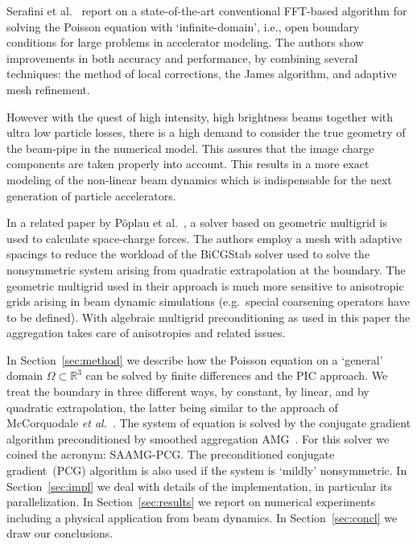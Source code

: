 \documentclass[a4paper,10pt,3p,preprint,pdftex]{elsarticle}
\renewcommand{\Re}{\mathbb{R}}
\newcommand{\oursolver}{\textsc{SAAMG-PCG}}
\begin{document}
Serafini et al.~\cite{serafini_2005} report on a state-of-the-art
conventional FFT-based algorithm for solving the Poisson equation with
`infinite-domain', i.e., open boundary conditions for large problems in
accelerator modeling.  The authors show improvements in both accuracy
and performance, by combining several techniques: the method of local
corrections, the James algorithm, and adaptive mesh refinement.

However with the quest of high intensity, high brightness beams together
with ultra low particle losses, there is a high demand to consider the
true geometry of the beam-pipe in the numerical model. This assures that
the image charge components are taken properly into account. This
results in a more exact modeling of the non-linear beam dynamics which
is indispensable for the next generation of particle accelerators.

In a related paper by P{\"o}plau et
al.~\cite{poplau_self-adaptive_2008}, a solver based on geometric
multigrid is used to calculate space-charge forces.  The authors employ
a mesh with adaptive spacings to reduce the workload of the BiCGStab
solver used to solve the nonsymmetric system arising from quadratic
extrapolation at the boundary.  The geometric multigrid used in their
approach is much more sensitive to anisotropic grids arising in beam
dynamic simulations (e.g.\ special coarsening operators have to be
defined).  With algebraic multigrid preconditioning as used in this
paper the aggregation takes care of anisotropies and related issues.

In Section~\ref{sec:method} we describe how the Poisson equation on a
`general' domain $\Omega \subset \Re^3$ can be solved by finite
differences and the PIC approach.  We treat the boundary in three
different ways, by constant, by linear, and by quadratic extrapolation,
the latter being similar to the approach of McCorquodale \textit{et
  al.}~\cite{mcgv:04}.  The system of equation is solved by the
conjugate gradient algorithm preconditioned by smoothed aggregation
AMG~\cite{vamb:96a, tuto:00}. For this solver we coined the acronym: \oursolver.  The preconditioned conjugate
gradient~(PCG) algorithm is also used if the system is `mildly'
nonsymmetric.  In Section~\ref{sec:impl} we deal with details of the
implementation, in particular its parallelization.  In
Section~\ref{sec:results} we report on numerical experiments including a
physical application from beam dynamics.  In Section~\ref{sec:concl} we
draw our conclusions.
\end{document}
